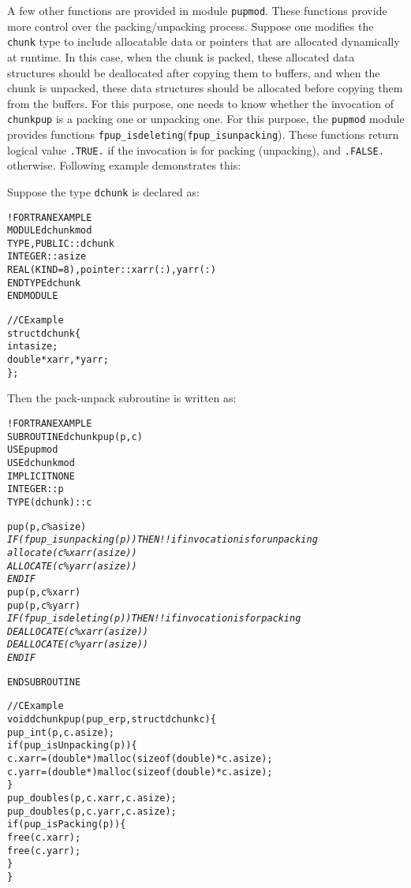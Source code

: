 \documentclass[10pt]{article}
\begin{document}
A few other functions are provided in module \texttt{pupmod}. These functions
provide more control over the packing/unpacking process. Suppose one modifies
the \texttt{chunk} type to include allocatable data or pointers that are
allocated dynamically at runtime. In this case, when the chunk is packed, these
allocated data structures should be deallocated after copying them to buffers,
and when the chunk is unpacked, these data structures should be allocated
before copying them from the buffers.  For this purpose, one needs to know
whether the invocation of \texttt{chunkpup} is a packing one or unpacking one.
For this purpose, the \texttt{pupmod} module provides functions
\verb+fpup_isdeleting+(\verb+fpup_isunpacking+). These functions return logical value
\verb+.TRUE.+ if the invocation is for packing (unpacking), and \verb+.FALSE.+
otherwise. Following example demonstrates this:

Suppose the type \texttt{dchunk} is declared as:

\begin{alltt}
!FORTRAN EXAMPLE
MODULE dchunkmod
  TYPE, PUBLIC :: dchunk
      INTEGER :: asize
      REAL(KIND=8), pointer :: xarr(:), yarr(:)
  END TYPE dchunk
END MODULE

//C Example
struct dchunk\{
  int asize;
  double* xarr, *yarr;
\};
\end{alltt}

Then the pack-unpack subroutine is written as:

\begin{alltt}
!FORTRAN EXAMPLE
SUBROUTINE dchunkpup(p, c)
  USE pupmod
  USE dchunkmod
  IMPLICIT NONE
  INTEGER :: p
  TYPE(dchunk) :: c

  pup(p, c\%asize)
  \emph{
  IF (fpup_isunpacking(p)) THEN       !! if invocation is for unpacking
    allocate(c\%xarr(asize))
    ALLOCATE(c\%yarr(asize))
  ENDIF
  }
  pup(p, c\%xarr)
  pup(p, c\%yarr)
  \emph{
  IF (fpup_isdeleting(p)) THEN        !! if invocation is for packing
    DEALLOCATE(c\%xarr(asize))
    DEALLOCATE(c\%yarr(asize))
  ENDIF
  }

END SUBROUTINE

//C Example
void dchunkpup(pup_er p, struct dchunk c)\{
  pup_int(p,c.asize);
  if(pup_isUnpacking(p))\{
    c.xarr = (double *)malloc(sizeof(double)*c.asize);
    c.yarr = (double *)malloc(sizeof(double)*c.asize);
  \}
  pup_doubles(p,c.xarr,c.asize);
  pup_doubles(p,c.yarr,c.asize);
  if(pup_isPacking(p))\{
    free(c.xarr);
    free(c.yarr);
  \}
\}
\end{alltt}
\end{document}
